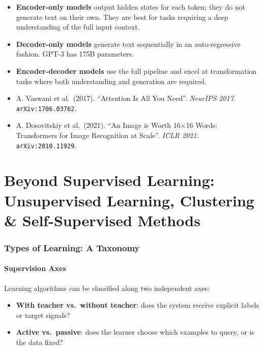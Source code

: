 \documentclass[11pt,a4paper]{article}
\theoremstyle{definition}
\theoremstyle{plain}
\theoremstyle{remark}
\begin{document}
\begin{itemize}
    \item \textbf{Encoder-only models} output hidden states for each token; they do not generate text on their own. They are best for tasks requiring a deep understanding of the full input context.
    \item \textbf{Decoder-only models} generate text sequentially in an auto-regressive fashion. GPT-3 has 175B parameters.
    \item \textbf{Encoder-decoder models} use the full pipeline and excel at transformation tasks where both understanding and generation are required.
\end{itemize}

\begin{tcolorbox}[colback=blue!5!white,colframe=blue!60!black,title={Key References}]
\begin{itemize}[leftmargin=*]
    \item A. Vaswani et al.\ (2017). ``Attention Is All You Need''. \textit{NeurIPS 2017}. \texttt{arXiv:1706.03762}.
    \item A. Dosovitskiy et al.\ (2021). ``An Image is Worth 16$\times$16 Words: Transformers for Image Recognition at Scale''. \textit{ICLR 2021}. \texttt{arXiv:2010.11929}.
\end{itemize}
\end{tcolorbox}



\part{Beyond Supervised Learning: Unsupervised Learning, Clustering \& Self-Supervised Methods}

\section{Types of Learning: A Taxonomy}

\subsection{Supervision Axes}

Learning algorithms can be classified along two independent axes:

\begin{itemize}
    \item \textbf{With teacher vs.\ without teacher}: does the system receive explicit labels or target signals?
    \item \textbf{Active vs.\ passive}: does the learner choose which examples to query, or is the data fixed?
\end{itemize}
\end{document}
